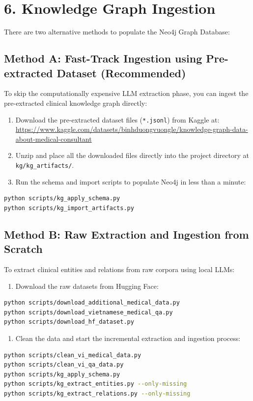 \documentclass[../main.tex]{subfiles}
\begin{document}
\section*{6. Knowledge Graph Ingestion}
There are two alternative methods to populate the Neo4j Graph Database:

\subsection*{Method A: Fast-Track Ingestion using Pre-extracted Dataset (Recommended)}
To skip the computationally expensive LLM extraction phase, you can ingest the pre-extracted clinical knowledge graph directly:
\begin{enumerate}
    \item Download the pre-extracted dataset files (\texttt{*.jsonl}) from Kaggle at: \\
    \url{https://www.kaggle.com/datasets/binhduongvuongle/knowledge-graph-data-about-medical-consultant}
    \item Unzip and place all the downloaded files directly into the project directory at \texttt{kg/kg\_artifacts/}.
    \item Run the schema and import scripts to populate Neo4j in less than a minute:
\end{enumerate}
\begin{lstlisting}[language=bash, breaklines=true]
python scripts/kg_apply_schema.py
python scripts/kg_import_artifacts.py
\end{lstlisting}

\subsection*{Method B: Raw Extraction and Ingestion from Scratch}
To extract clinical entities and relations from raw corpora using local LLMs:
\begin{enumerate}
    \item Download the raw datasets from Hugging Face:
\end{enumerate}
\begin{lstlisting}[language=bash, breaklines=true]
python scripts/download_additional_medical_data.py
python scripts/download_vietnamese_medical_qa.py
python scripts/download_hf_dataset.py
\end{lstlisting}
\begin{enumerate}
    \item Clean the data and start the incremental extraction and ingestion process:
\end{enumerate}
\begin{lstlisting}[language=bash, breaklines=true]
python scripts/clean_vi_medical_data.py
python scripts/clean_vi_qa_data.py
python scripts/kg_apply_schema.py
python scripts/kg_extract_entities.py --only-missing
python scripts/kg_extract_relations.py --only-missing
\end{lstlisting}
\end{document}
